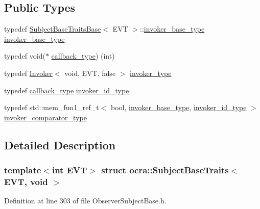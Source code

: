 \subsection*{Public Types}
\begin{DoxyCompactItemize}
\item 
typedef \hyperlink{structocra_1_1SubjectBaseTraitsBase}{Subject\+Base\+Traits\+Base}$<$ E\+VT $>$\+::\hyperlink{structocra_1_1SubjectBaseTraitsBase_a439671662c8f8f3e80e6675f008dec3f}{invoker\+\_\+base\+\_\+type} \hyperlink{structocra_1_1SubjectBaseTraits_3_01EVT_00_01void_01_4_a28d0e1b20cde0e239218e2ef724502b1}{invoker\+\_\+base\+\_\+type}
\item 
typedef void($\ast$ \hyperlink{structocra_1_1SubjectBaseTraits_3_01EVT_00_01void_01_4_a805e01034816edb44ee4269aba6c5beb}{callback\+\_\+type}) (int)
\item 
typedef \hyperlink{classocra_1_1Invoker}{Invoker}$<$ void, E\+VT, false $>$ \hyperlink{structocra_1_1SubjectBaseTraits_3_01EVT_00_01void_01_4_af6c08a6cdc4753f4246a8eebaf73152c}{invoker\+\_\+type}
\item 
typedef \hyperlink{structocra_1_1SubjectBaseTraits_3_01EVT_00_01void_01_4_a805e01034816edb44ee4269aba6c5beb}{callback\+\_\+type} \hyperlink{structocra_1_1SubjectBaseTraits_3_01EVT_00_01void_01_4_a35ce9f06a9f2a9e766ad2fb892283d08}{invoker\+\_\+id\+\_\+type}
\item 
typedef std\+::mem\+\_\+fun1\+\_\+ref\+\_\+t$<$ bool, \hyperlink{structocra_1_1SubjectBaseTraitsBase_a439671662c8f8f3e80e6675f008dec3f}{invoker\+\_\+base\+\_\+type}, \hyperlink{structocra_1_1SubjectBaseTraits_3_01EVT_00_01void_01_4_a35ce9f06a9f2a9e766ad2fb892283d08}{invoker\+\_\+id\+\_\+type} $>$ \hyperlink{structocra_1_1SubjectBaseTraits_3_01EVT_00_01void_01_4_a1103b087174cb0f6e007f554c214c4d4}{invoker\+\_\+comparator\+\_\+type}
\end{DoxyCompactItemize}


\subsection{Detailed Description}
\subsubsection*{template$<$int E\+VT$>$\newline
struct ocra\+::\+Subject\+Base\+Traits$<$ E\+V\+T, void $>$}



Definition at line 303 of file Observer\+Subject\+Base.\+h.



